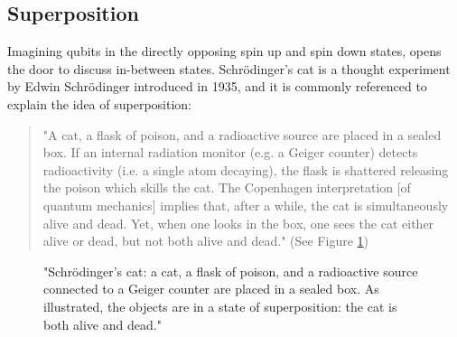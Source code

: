     \subsection{Superposition} \label{superposition}
    Imagining qubits in the directly opposing spin up and spin down states, opens the door to discuss in-between states. Schr\"{o}dinger's cat is a thought experiment by Edwin Schr\"{o}dinger introduced in 1935, and it is commonly referenced to explain the idea of superposition:
    
    \begin{quote}
        "A cat, a flask of poison, and a radioactive source are placed in a sealed box. If an internal radiation monitor (e.g. a Geiger counter) detects radioactivity (i.e. a single atom decaying), the flask is shattered releasing the poison which skills the cat. The Copenhagen interpretation [of quantum mechanics] implies that, after a while, the cat is simultaneously alive and dead. Yet, when one looks in the box, one sees the cat either alive or dead, but not both alive and dead." (See Figure \ref{fig:cat}) \cite{schrodinger}
    \end{quote}
    
    \begin{figure}[ht] 
        \centering
        {
            \captionsetup{justification=centering}
            \caption{"Schr\"{o}dinger's cat: a cat, a flask of poison, and a radioactive source connected to a Geiger counter are placed in a sealed box. As illustrated, the objects are in a state of superposition: the cat is both alive and dead." \cite{schrodinger}}
            \label{fig:cat}
        }
    \end{figure}
    
